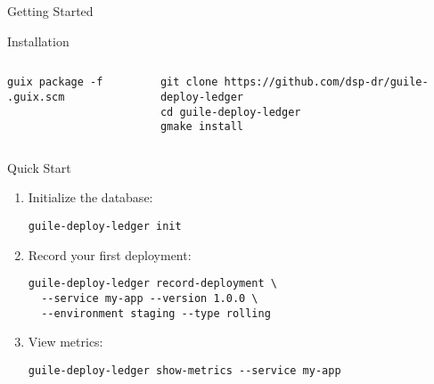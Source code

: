 \documentclass[presentation,aspectratio=169]{beamer}
\begin{document}
\begin{frame}[label={sec:org3744405},fragile]{Getting Started}
 \begin{block}{Installation}
\begin{columns}
\begin{column}{0.5\columnwidth}
\begin{verbatim}
guix package -f .guix.scm
\end{verbatim}
\end{column}
\begin{column}{0.5\columnwidth}
\begin{verbatim}
git clone https://github.com/dsp-dr/guile-deploy-ledger
cd guile-deploy-ledger
gmake install
\end{verbatim}
\end{column}
\end{columns}
\end{block}
\begin{block}{Quick Start}
\begin{enumerate}
\item Initialize the database:
\begin{verbatim}
guile-deploy-ledger init
\end{verbatim}

\item Record your first deployment:
\begin{verbatim}
guile-deploy-ledger record-deployment \
  --service my-app --version 1.0.0 \
  --environment staging --type rolling
\end{verbatim}

\item View metrics:
\begin{verbatim}
guile-deploy-ledger show-metrics --service my-app
\end{verbatim}
\end{enumerate}
\end{block}
\end{frame}
\end{document}
